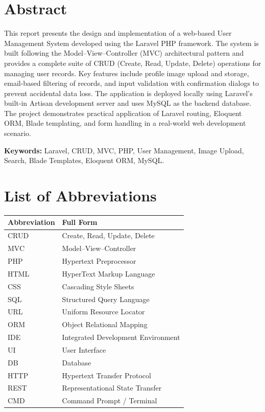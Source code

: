 \documentclass[12pt,a4paper]{report}
\begin{document}

\chapter*{Abstract}

This report presents the design and implementation of a web-based User Management
System developed using the Laravel PHP framework. The system is built following the
Model--View--Controller (MVC) architectural pattern and provides a complete suite of
CRUD (Create, Read, Update, Delete) operations for managing user records. Key
features include profile image upload and storage, email-based filtering of records, and
input validation with confirmation dialogs to prevent accidental data loss. The
application is deployed locally using Laravel's built-in Artisan development server and
uses MySQL as the backend database. The project demonstrates practical application
of Laravel routing, Eloquent ORM, Blade templating, and form handling in a real-world
web development scenario.

\vspace{1cm}
\textbf{Keywords:} Laravel, CRUD, MVC, PHP, User Management, Image Upload,
Search, Blade Templates, Eloquent ORM, MySQL.

\chapter*{List of Abbreviations}

\begin{tabularx}{\textwidth}{@{}lX@{}}
\toprule
\textbf{Abbreviation} & \textbf{Full Form} \\
\midrule
CRUD   & Create, Read, Update, Delete \\
MVC    & Model--View--Controller \\
PHP    & Hypertext Preprocessor \\
HTML   & HyperText Markup Language \\
CSS    & Cascading Style Sheets \\
SQL    & Structured Query Language \\
URL    & Uniform Resource Locator \\
ORM    & Object Relational Mapping \\
IDE    & Integrated Development Environment \\
UI     & User Interface \\
DB     & Database \\
HTTP   & Hypertext Transfer Protocol \\
REST   & Representational State Transfer \\
CMD    & Command Prompt / Terminal \\
\bottomrule
\end{tabularx}
\clearpage
{}
\end{document}
